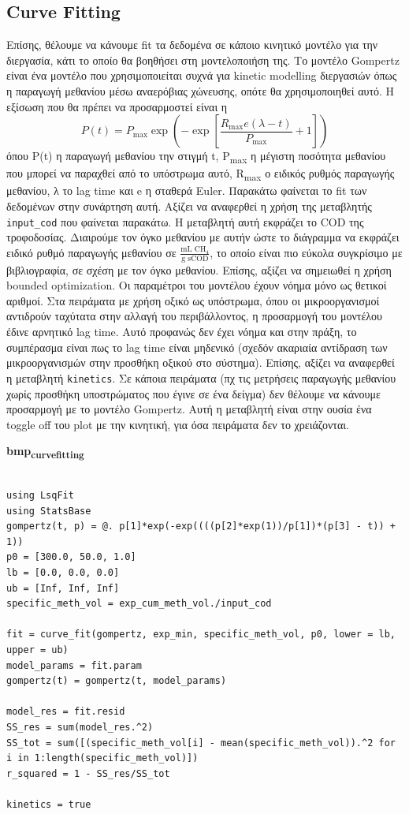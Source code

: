 \documentclass[11pt]{article}
\begin{document}
\subsection{Curve Fitting}
\label{sec:org04de2d7}
Επίσης, θέλουμε να κάνουμε fit τα δεδομένα σε κάποιο κινητικό μοντέλο για την διεργασία, κάτι το οποίο θα βοηθήσει στη μοντελοποιήση της. Το μοντέλο Gompertz είναι ένα μοντέλο που χρησιμοποιείται συχνά για kinetic modelling διεργασιών όπως η παραγωγή μεθανίου μέσω αναερόβιας χώνευσης, οπότε θα χρησιμοποιηθεί αυτό. Η εξίσωση που θα πρέπει να προσαρμοστεί είναι η
\[ P(t) = P_{\max } \exp \left( - \exp \left[ \frac{R_{\max }e (λ-t)}{P_{\max }} + 1 \right] \right) \]
όπου P(t) η παραγωγή μεθανίου την στιγμή t, P\textsubscript{max} η μέγιστη ποσότητα μεθανίου που μπορεί να παραχθεί από το υπόστρωμα αυτό, R\textsubscript{max} ο ειδικός ρυθμός παραγωγής μεθανίου, λ το lag time και e η σταθερά Euler. Παρακάτω φαίνεται το fit των δεδομένων στην συνάρτηση αυτή. Αξίζει να αναφερθεί η χρήση της μεταβλητής \texttt{input\_cod} που φαίνεται παρακάτω. Η μεταβλητή αυτή εκφράζει το COD της τροφοδοσίας. Διαιρούμε τον όγκο μεθανίου με αυτήν ώστε το διάγραμμα να εκφράζει ειδικό ρυθμό παραγωγής μεθανίου σε \(\frac{\text{mL CH$_4$}}{\text{g sCOD}}\), το οποίο είναι πιο εύκολα συγκρίσιμο με βιβλιογραφία, σε σχέση με τον όγκο μεθανίου. Επίσης, αξίζει να σημειωθεί η χρήση bounded optimization. Οι παραμέτροι του μοντέλου έχουν νόημα μόνο ως θετικοί αριθμοί. Στα πειράματα με χρήση οξικό ως υπόστρωμα, όπου οι μικροοργανισμοί αντιδρούν ταχύτατα στην αλλαγή του περιβάλλοντος, η προσαρμογή του μοντέλου έδινε αρνητικό lag time. Αυτό προφανώς δεν έχει νόημα και στην πράξη, το συμπέρασμα είναι πως το lag time είναι μηδενικό (σχεδόν ακαριαία αντίδραση των μικροοργανισμών στην προσθήκη οξικού στο σύστημα). Επίσης, αξίζει να αναφερθεί η μεταβλητή \texttt{kinetics}. Σε κάποια πειράματα (πχ τις μετρήσεις παραγωγής μεθανίου χωρίς προσθήκη υποστρώματος που έγινε σε ένα δείγμα) δεν θέλουμε να κάνουμε προσαρμογή με το μοντέλο Gompertz. Αυτή η μεταβλητή είναι στην ουσία ένα toggle off του plot με την κινητική, για όσα πειράματα δεν το χρειάζονται.

\textbf{bmp\textsubscript{curve}\textsubscript{fitting}}
\begin{verbatim}

using LsqFit
using StatsBase
gompertz(t, p) = @. p[1]*exp(-exp((((p[2]*exp(1))/p[1])*(p[3] - t)) + 1))
p0 = [300.0, 50.0, 1.0]
lb = [0.0, 0.0, 0.0]
ub = [Inf, Inf, Inf]
specific_meth_vol = exp_cum_meth_vol./input_cod

fit = curve_fit(gompertz, exp_min, specific_meth_vol, p0, lower = lb, upper = ub)
model_params = fit.param
gompertz(t) = gompertz(t, model_params)

model_res = fit.resid
SS_res = sum(model_res.^2)
SS_tot = sum([(specific_meth_vol[i] - mean(specific_meth_vol)).^2 for i in 1:length(specific_meth_vol)])
r_squared = 1 - SS_res/SS_tot

kinetics = true

\end{verbatim}
\end{document}
